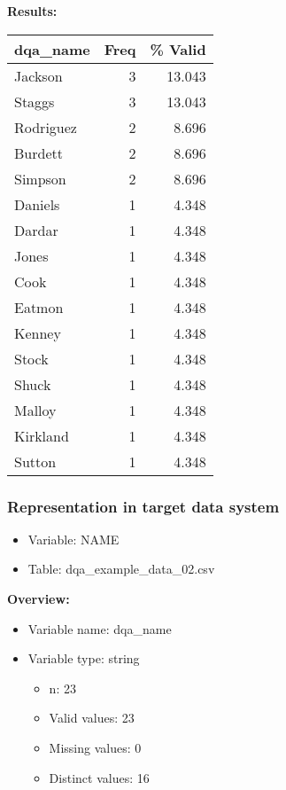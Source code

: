 \documentclass[
]{article}
\providecommand{\tightlist}{%
  \setlength{\itemsep}{0pt}\setlength{\parskip}{0pt}}
\begin{document}
\textbf{Results:}\\

\begin{table}[H]
\centering
\begin{tabular}{l|r|r}
\hline
\textbf{dqa\_name} & \textbf{Freq} & \textbf{\% Valid}\\
\hline
Jackson & 3 & 13.043\\
\hline
Staggs & 3 & 13.043\\
\hline
Rodriguez & 2 & 8.696\\
\hline
Burdett & 2 & 8.696\\
\hline
Simpson & 2 & 8.696\\
\hline
Daniels & 1 & 4.348\\
\hline
Dardar & 1 & 4.348\\
\hline
Jones & 1 & 4.348\\
\hline
Cook & 1 & 4.348\\
\hline
Eatmon & 1 & 4.348\\
\hline
Kenney & 1 & 4.348\\
\hline
Stock & 1 & 4.348\\
\hline
Shuck & 1 & 4.348\\
\hline
Malloy & 1 & 4.348\\
\hline
Kirkland & 1 & 4.348\\
\hline
Sutton & 1 & 4.348\\
\hline
\end{tabular}
\end{table}
\newpage

\hypertarget{representation-in-target-data-system-9}{%
\subsubsection{\texorpdfstring{Representation in \textbf{target} data
system}{Representation in target data system}}\label{representation-in-target-data-system-9}}

\begin{itemize}
\tightlist
\item
  Variable: NAME
\item
  Table: dqa\_example\_data\_02.csv
\end{itemize}

\textbf{Overview:}

\begin{itemize}
\tightlist
\item
  Variable name: dqa\_name
\item
  Variable type: string

  \begin{itemize}
  \tightlist
  \item
    n: 23
  \item
    Valid values: 23
  \item
    Missing values: 0
  \item
    Distinct values: 16
  \end{itemize}
\end{itemize}
\end{document}
